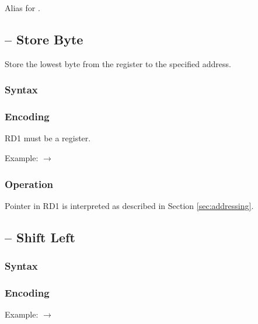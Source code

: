 \documentclass[a4paper,12pt,twoside,extrafontsizes]{memoir}
\begin{document}
{Alias for .

\subsection{ -- Store Byte}
\label{subsec:instr:sb}

Store the lowest byte from the register to the specified address.

\subsubsection{Syntax}


\subsubsection{Encoding}


RD1 must be a register.

Example:  $\rightarrow$ 

\subsubsection{Operation}


Pointer in RD1 is interpreted as described in Section \ref{sec:addressing}.

\subsection{ -- Shift Left}
\label{subsec:instr:sl}

\subsubsection{Syntax}


\subsubsection{Encoding}


Example:  $\rightarrow$ 

}
\end{document}

